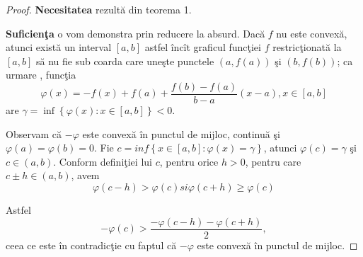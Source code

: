 \documentclass[a4paper,12pt,oneside]{report}
\begin{document}
\begin{proof}
\textbf{Necesitatea }rezult\u{a} din teorema 1.

\textbf{Suficien\c{t}a} o vom demonstra prin reducere la absurd. Dac\u{a} \(f\) nu este convex\u{a}, atunci exist\u{a} un interval \(\left [ a,b \right ]\) astfel \^{i}nc\^{i}t graficul func\c{t}iei \(f\) restric\c{t}ionat\u{a} la  \(\left [ a,b \right ]\) s\u{a} nu fie sub coarda care une\c{s}te punctele \(\left ( a, f\left ( a \right ) \right )\) \c{s}i \(\left ( b, f\left ( b \right ) \right )\); ca urmare , func\c{t}ia
\begin{displaymath}
  \varphi \left ( x \right )= -f\left ( x \right ) + f\left ( a \right )+ \frac{f\left ( b \right )- f\left ( a \right )}{b-a}\left ( x-a \right ), x\in \left [ a,b \right ]
\end{displaymath}
are  \(\gamma = \inf \left \{ \varphi \left ( x \right ) : x\in \left [ a,b \right ]\right \}< 0\).

Observam c\u{a} \(-\varphi\) este convex\u{a} \^{i}n punctul de mijloc, continu\u{a} \c{s}i \(\varphi \left ( a \right ) =\varphi \left ( b \right ) = 0\). Fie \(c = inf \left \{ x \in \left [ a,b  \right ] : \varphi \left ( x \right )= \gamma \right \} \), atunci \(\varphi \left ( c \right ) = \gamma\)  \c{s}i \(c \in \left ( a,b  \right )\). Conform defini\c{t}iei lui \(c\), pentru orice \(h>0\), pentru care \(c\pm h\in \left ( a,b \right )\), avem
\begin{displaymath}
  \varphi \left ( c - h  \right )> \varphi \left ( c \right ) si \varphi \left ( c + h  \right )\geq  \varphi \left ( c \right )
\end{displaymath}

\noindent Astfel
\begin{displaymath}
  -\varphi \left ( c \right )> \frac{-\varphi \left ( c-h \right )-\varphi \left ( c+h \right )}{2},
\end{displaymath}
ceea ce este \^{i}n contradic\c{t}ie cu faptul c\u{a} \(-\varphi\) este convex\u{a} \^{i}n punctul de mijloc.
\end{proof}
\end{document}
